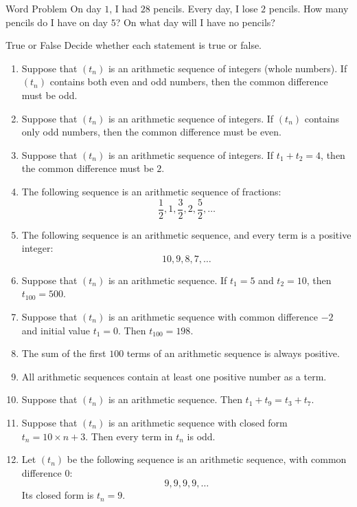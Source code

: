 \documentclass[12pt,letterpaper]{article}
\begin{document}
\begin{problem}{Word Problem}
 On day $1$, I had $28$ pencils. Every day, I lose $2$ pencils. How many
 pencils do I have on day $5$? On what day will I have no pencils?
\end{problem}

\begin{problem}{True or False}
  Decide whether each statement is true or false.

  \begin{enumerate}
    \item Suppose that \((t_n)\) is an arithmetic sequence of integers (whole
    numbers). If \((t_n)\) contains both even and odd numbers, then the common
    difference must be odd.
    \hfill \TFTrue
    \item Suppose that \((t_n)\) is an arithmetic sequence of integers. If
    \((t_n)\) contains only odd numbers, then the common difference must be
    even.
    \hfill \TFTrue
    \item Suppose that \((t_n)\) is an arithmetic sequence of integers. If
    \(t_1 + t_2 = 4\), then the common difference must be \(2\).
    \hfill \TFFalse
    \item The following sequence is an arithmetic sequence of fractions: \[
      \frac{1}{2}, 1, \frac{3}{2}, 2, \frac{5}{2}, \dots
    \]
    \hfill \TFTrue
    \item The following sequence is an arithmetic sequence, and every term is a positive integer: \[
      10, 9, 8, 7, \dots
    \]
    \hfill \TFFalse
    \item Suppose that \((t_n)\) is an arithmetic sequence. If \(t_1 = 5\) and
    \(t_2 = 10\), then \(t_{100} = 500\).
    \hfill \TFTrue
    \item Suppose that \((t_n)\) is an arithmetic sequence with common
    difference \(-2\) and initial value \(t_1 = 0\). Then \(t_{100} = 198\).
    \hfill \TFFalse
    \item The sum of the first \(100\) terms of an arithmetic sequence is
    always positive.
    \hfill \TFFalse
    \item All arithmetic sequences contain at least one positive number as a
    term.
    \hfill \TFFalse
    \item Suppose that \((t_n)\) is an arithmetic sequence. Then \(t_1 + t_9 =
    t_3 + t_7\).
    \hfill \TFTrue
    \item Suppose that \((t_n)\) is an arithmetic sequence with closed form
    \(t_n = 10 \times n + 3\). Then every term in \(t_n\) is odd.
    \hfill \TFFalse
    \item Let \((t_n)\) be the following sequence is an arithmetic sequence,
    with common difference \(0\): \[
      9, 9, 9, 9, \dots
    \]
    Its closed form is \(t_n = 9\).
    \hfill \TFTrue
  \end{enumerate}
\end{problem}
\end{document}
